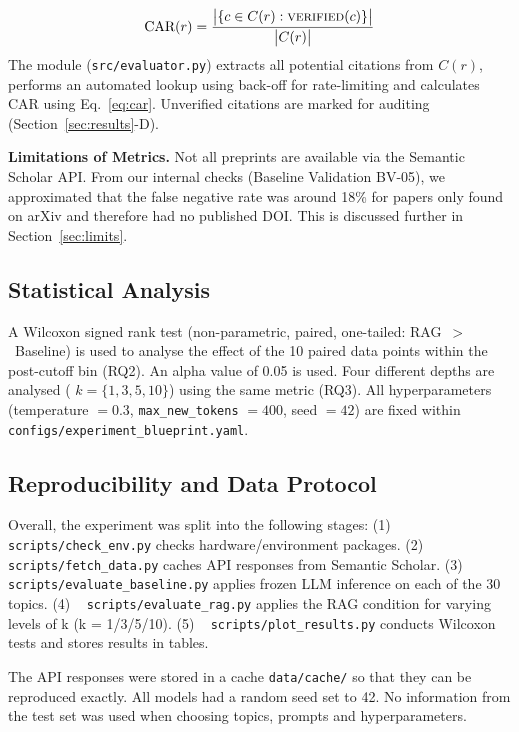\documentclass[conference]{IEEEtran}
\begin{document}
\begin{equation}
\text{CAR}(r) =
\frac{\bigl|\{c \in C(r):\textsc{verified}(c)\}\bigr|}{\bigl|C(r)\bigr|}
\label{eq:car}
\end{equation}
The module (\texttt{src/evaluator.py}) extracts all potential citations from $C(r)$, performs an automated lookup using back-off for rate-limiting and calculates CAR using Eq.~\eqref{eq:car}. Unverified citations are marked for auditing (Section~\ref{sec:results}-D).

\textbf{Limitations of Metrics.} Not all preprints are available via the Semantic Scholar API. From our internal checks (Baseline Validation BV-05), we approximated that the false negative rate was around 18\% for papers only found on arXiv and therefore had no published DOI. This is discussed further in Section~\ref{sec:limits}.

\subsection{Statistical Analysis}

A Wilcoxon signed rank test (non-parametric, paired, one-tailed: RAG~$>$~Baseline) is used to analyse the effect of the 10 paired data points within the post-cutoff bin (RQ2). An alpha value of 0.05 is used. Four different depths are analysed ( $k = \{1, 3, 5, 10\} $) using the same metric (RQ3). All hyperparameters (temperature $= 0.3$, \texttt{max\_new\_tokens} $= 400$, seed $= 42$) are fixed within \texttt{configs/experiment\_blueprint.yaml}.

\subsection{Reproducibility and Data Protocol}

Overall, the experiment was split into the following stages:
(1) ~ \texttt{scripts/check\_env.py} checks hardware/environment packages.
(2) ~ \texttt{scripts/fetch\_data.py} caches API responses from Semantic Scholar.
(3) ~ \texttt{scripts/evaluate\_baseline.py} applies frozen LLM inference on each of the 30 topics.
(4) ~ \texttt{scripts/evaluate\_rag.py} applies the RAG condition for varying levels of k (k = 1/3/5/10).
(5) ~ \texttt{scripts/plot\_results.py} conducts Wilcoxon tests and stores results in tables.

The API responses were stored in a cache \texttt{data/cache/} so that they can be reproduced exactly. All models had a random seed set to 42. No information from the test set was used when choosing topics, prompts and hyperparameters.
\end{document}
